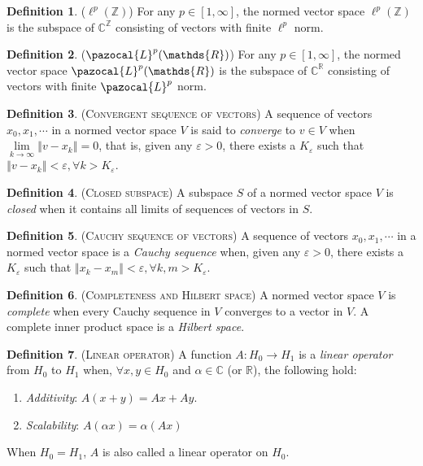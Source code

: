 \documentclass[9pt, twocolumn]{extarticle}
\theoremstyle{definition}
\newtheorem{definition}{Definition}
\newcommand{\norm}[1]{\left\Vert #1\right\Vert}
\begin{document}
\begin{definition}{($ \ell^p(\mathds{Z}) $)}
  For any $ p\in[1,\infty]$, the normed vector space $\ell^p(\mathds{Z})$ is the subspace of $ \mathds{C}^\mathds{Z}  $ consisting of vectors with finite $ \ell^p $ norm.
\end{definition}

\begin{definition}{($ \pazocal{L}^p(\mathds{R}) $)}
  For any $ p\in[1,\infty]$, the normed vector space $\pazocal{L}^p(\mathds{R})$ is the subspace of $ \mathds{C}^\mathds{R} $ consisting of vectors with finite $ \pazocal{L}^p $ norm.
\end{definition}

\begin{definition}{(\textsc{Convergent sequence of vectors})}
  A sequence of vectors $ x_0, x_1, \cdots $ in a normed vector space $ V $ is said to \emph{converge} to $ v\in V $ when $ \lim\limits_{k\rightarrow\infty}\norm{v-x_k} = 0 $, that is, given any $ \varepsilon > 0 $, there exists a $ K_\varepsilon $ such that $ \norm{v-x_k} < \varepsilon, \forall k > K_\varepsilon $.
\end{definition}

\begin{definition}{(\textsc{Closed subspace})}
  A subspace $ S $ of a normed vector space $ V $ is \emph{closed} when it contains all limits of sequences of vectors in $ S $.
\end{definition}

\begin{definition}{(\textsc{Cauchy sequence of vectors})}
  A sequence of vectors $ x_0, x_1, \cdots $ in a normed vector space is a \emph{Cauchy sequence} when, given any $ \varepsilon > 0 $, there exists a $ K_\varepsilon $ such that $ \norm{x_k-x_m} < \varepsilon, \forall k, m > K_\varepsilon $.
\end{definition}

\begin{definition}{(\textsc{Completeness and Hilbert space})}
  A normed vector space $ V $ is \emph{complete} when every Cauchy sequence in $ V $ converges to a vector in $ V $. A complete inner product space is a \emph{Hilbert space}.
\end{definition}

\begin{definition}{(\textsc{Linear operator})}
  A function $ A:H_0\rightarrow H_1 $ is a \emph{linear operator} from $ H_0 $ to $ H_1 $ when, $ \forall x,y \in H_0 $ and $ \alpha\in\mathds{C} $ (or $ \mathds{R} $), the following hold:
  \begin{enumerate}[label=(\roman*)]
    \item \emph{Additivity}: $ A(x+y) = Ax + Ay$.
    \item \emph{Scalability}: $ A(\alpha x) = \alpha(Ax)$
  \end{enumerate}
  When $ H_0 = H_1 $, $ A $ is also called a linear operator on $ H_0 $.
\end{definition}
\end{document}
